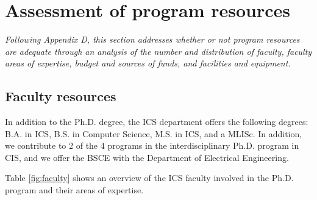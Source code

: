 \documentclass[12pt]{article}
\begin{document}
\section{Assessment of program resources}

{\em Following Appendix D, this section addresses whether or not program
  resources are adequate through an analysis of the number and distribution
  of faculty, faculty areas of expertise, budget and sources of funds, and
  facilities and equipment.}

\subsection{Faculty resources}

In addition to the Ph.D. degree, the ICS department offers the following
degrees: B.A. in ICS, B.S. in Computer Science, M.S. in
ICS, and a MLISc. In addition, we contribute to 2 of the 4 programs
in the interdisciplinary Ph.D. program in CIS, and we offer the BSCE with the
Department of Electrical Engineering.

Table \ref{fig:faculty} shows an overview of the ICS faculty involved in
the Ph.D. program and their areas of expertise.
\end{document}
